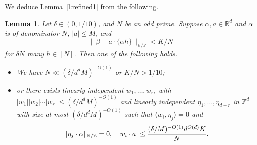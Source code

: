 \documentclass[11pt, a4paper]{amsart}
\theoremstyle{plain}
\theoremstyle{plain}
\newtheorem{lemma}{Lemma}
\theoremstyle{definition}
\theoremstyle{remark}
\numberwithin{equation}{section}
\numberwithin{lemma}{section}
\numberwithin{proposition}{section}
\numberwithin{corollary}{section}
\numberwithin{definition}{section}
\numberwithin{claim}{section}
\begin{document}
We deduce Lemma~\ref{l:refined1} from the following.
\begin{lemma}\label{l:easierrefined1}
    Let $\delta \in (0, 1/10)$, and $N$ be an odd prime. Suppose $\alpha, a \in \mathbb{R}^{d}$ and $\alpha$ is of denominator $N$, $|a| \le M$, and
    $$\|\beta + a \cdot \{\alpha h\}\|_{\mathbb{R}/\mathbb{Z}} < K/N$$
    for $\delta N$ many $h \in [N]$. Then one of the following holds.
    \begin{itemize}
        \item We have $N \ll (\delta/d^{d}M)^{-O(1)}$ or $K/N > 1/10$;
        \item or there exists linearly independent $w_1, \dots, w_r$, with $|w_1||w_2| \cdots |w_r| \le (\delta/d^{d} M)^{-O(1)}$ and linearly independent $\eta_1, \dots, \eta_{d - r}$ in $\mathbb{Z}^{d}$ with size at most $(\delta/d^{d} M)^{-O(1)}$ such that $\langle w_i, \eta_j \rangle = 0$ and
    $$\|\eta_j \cdot \alpha\|_{\mathbb{R}/\mathbb{Z}} = 0, \hspace{0.1in} |w_i \cdot a| \le \frac{(\delta/M)^{-O(1)}d^{O(d)}K}{N}.$$
    \end{itemize}
\end{lemma}
\end{document}
